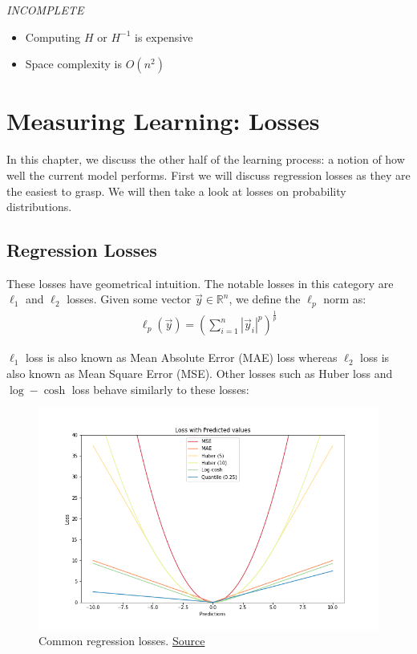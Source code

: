 \documentclass[paper=a4, fontsize=12pt]{scrartcl} %
\numberwithin{equation}{section} %
\numberwithin{figure}{section} %
\numberwithin{table}{section} %
\begin{document}
\textit{INCOMPLETE}

\begin{itemize}
    \item Computing $H$ or $H^{-1}$ is expensive
    \item Space complexity is $O(n^2)$
\end{itemize}

\pagebreak


\section{Measuring Learning: Losses}

In this chapter, we discuss the other half of the learning process: a notion of how well the current 
model performs. First we will discuss regression losses as they are the easiest to grasp. We will then 
take a look at losses on probability distributions.

\subsection{Regression Losses}
These losses have geometrical intuition. The notable losses in this category are $\ell_1$ and $\ell_2$ losses.
Given some vector $\vec{y} \in \mathbb{R}^n$, we define the $\ell_p$ norm as:
\begin{align*}
    \ell_p (\vec{y}) = \left( \sum_{i=1}^n | \vec{y}_i |^p \right)^{\frac{1}{p}}
\end{align*}

$\ell_1$ loss is also known as Mean Absolute Error (MAE) loss whereas $\ell_2$ loss is also known as Mean Square Error (MSE).
Other losses such as Huber loss and $\log-\cosh$ loss behave similarly to these losses:
\begin{figure}[H]
    \centering
    \includegraphics[width=1.0\textwidth]{images/regressions}
    \caption{Common regression losses. \href{https://heartbeat.fritz.ai/5-regression-loss-functions-all-machine-learners-should-know-4fb140e9d4b0}{Source}}
\end{figure}
\end{document}
